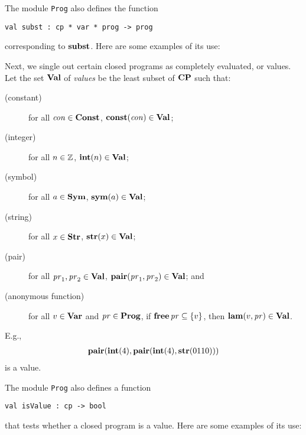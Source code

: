 The module \texttt{Prog} also defines the function
\begin{verbatim}
val subst : cp * var * prog -> prog
\end{verbatim}
%
corresponding to $\mathbf{subst}$.  Here are some examples of its use:


Next, we single out certain closed programs as completely evaluated,
%
%
or values.  Let the set $\mathbf{Val}$ of \emph{values} be the least subset of
$\mathbf{CP}$ such that:
\begin{description}
\item[\quad(constant)] for all $\mathit{con}\in\mathbf{Const}$,
  $\mathbf{const}(\mathit{con})\in\mathbf{Val}$;

\item[\quad(integer)] for all $n\in\mathbb{Z}$, $\mathbf{int}(n)\in\mathbf{Val}$;

\item[\quad(symbol)] for all $a\in\mathbf{Sym}$, $\mathbf{sym}(a)\in\mathbf{Val}$;

\item[\quad(string)] for all $x\in\mathbf{Str}$, $\mathbf{str}(x)\in\mathbf{Val}$;

\item[\quad(pair)] for all $\mathit{pr}_1,\mathit{pr}_2\in\mathbf{Val}$,
  $\mathbf{pair}(\mathit{pr}_1,\mathit{pr}_2)\in\mathbf{Val}$; and

\item[\quad(anonymous function)] for all $v\in\mathbf{Var}$ and
  $\mathit{pr}\in\mathbf{Prog}$, if $\mathbf{free}\,\mathit{pr}\subseteq\{v\}$, then
  $\mathbf{lam}(v,\mathit{pr})\in\mathbf{Val}$.
\end{description}
E.g.,
\begin{gather*}
\mathbf{pair}(\mathbf{int}(4), \mathbf{pair}(\mathbf{int}(4), \mathbf{str}(0110)))  
\end{gather*}
is a value.

The module \texttt{Prog} also defines a function
\begin{verbatim}
val isValue : cp -> bool
\end{verbatim}
%
that tests whether a closed program is a value.  Here are some
examples of its use:


